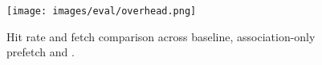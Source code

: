    
    
                \begin{figure}[h]
                    \centering
                    \texttt{[image: images/eval/overhead.png]}
                    \caption{Hit rate and fetch comparison across baseline, association-only prefetch and \spaarc{}. %
                    }
                    \label{fig:overhead_fetches}
                \end{figure}

